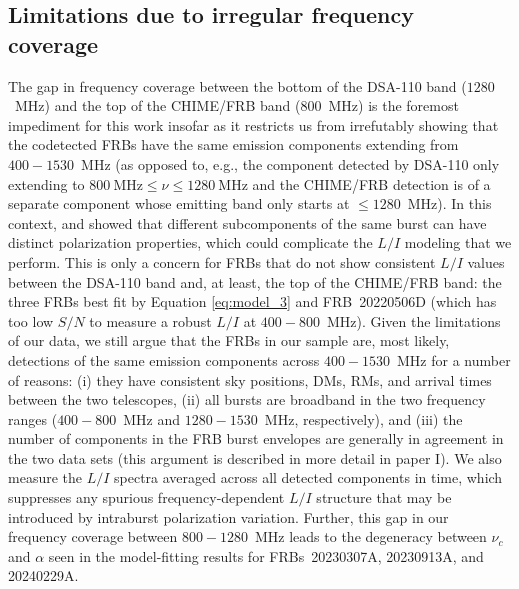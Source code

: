 \documentclass[twocolumn, linenumbers]{aastex701}
\begin{document}
\subsection{Limitations due to irregular frequency coverage} \label{sec:discussion_freq_limitations}
The gap in frequency coverage between the bottom of the DSA-110 band ($1280$~MHz) and the top of the CHIME/FRB band ($800$~MHz) is the foremost impediment for this work insofar as it restricts us from irrefutably showing that the codetected FRBs have the same emission components extending from $400-1530$~MHz (as opposed to, e.g., the component detected by DSA-110 only extending to $800~\mathrm{MHz}\leq \nu \leq 1280~\mathrm{MHz}$ and the CHIME/FRB detection is of a separate component whose emitting band only starts at $\leq 1280$~MHz). In this context, \cite{2020ApJ...891L..38C} and \cite{2024ApJ...968...50P} showed that different subcomponents of the same burst can have distinct polarization properties, which could complicate the $L/I$ modeling that we perform. This is only a concern for FRBs that do not show consistent $L/I$ values between the DSA-110 band and, at least, the top of the CHIME/FRB band: the three FRBs best fit by Equation \ref{eq:model_3} and FRB~20220506D (which has too low $S/N$ to measure a robust $L/I$ at $400-800$~MHz). Given the limitations of our data, we still argue that the FRBs in our sample are, most likely, detections of the same emission components across $400-1530$~MHz for a number of reasons: (i) they have consistent sky positions, DMs, RMs, and arrival times between the two telescopes, (ii) all bursts are broadband in the two frequency ranges ($400-800$~MHz and $1280-1530$~MHz, respectively), and (iii) the number of components in the FRB burst envelopes are generally in agreement in the two data sets (this argument is described in more detail in paper I). We also measure the $L/I$ spectra averaged across all detected components in time, which suppresses any spurious frequency-dependent $L/I$ structure that may be introduced by intraburst polarization variation. Further, this gap in our frequency coverage between $800-1280$~MHz leads to the degeneracy between $\nu_c$ and $\alpha$ seen in the model-fitting results for FRBs~20230307A, 20230913A, and 20240229A.
\end{document}
